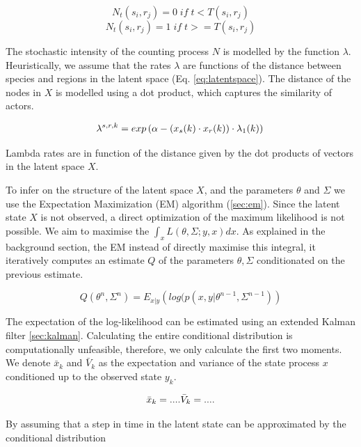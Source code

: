 \documentclass[mscthesis]{usiinfthesis}
\begin{document}
\[
N_t(s_i, r_j) = 0 \; if \; t < T(s_i, r_j)
\]
\[
N_t(s_i, r_j) = 1 \; if \; t >= T(s_i, r_j)
\]

The stochastic intensity of the counting process $N$ is modelled by the function $\lambda$. Heuristically, we assume that the rates $\lambda$ are functions of the distance between species and regions in the latent space (Eq. \ref{eq:latentspace}). The distance of the nodes in $X$ is modelled using a dot product, which captures the similarity of actors.

\begin{eqfloat}
\begin{equation}
\lambda^{s, r, k} = exp\left(\alpha-(x_s(k) \cdot x_r(k)) \cdot \lambda_1(k) \right) \\
\label{eq:ourmodel_lambda}
\end{equation}
\caption{Lambda rates are in function of the distance given by the dot products of vectors in the latent space $X$.}
\end{eqfloat}

To infer on the structure of the latent space $X$, and the parameters $\theta$  and $\Sigma$ we use the Expectation Maximization (EM) algorithm (\ref{sec:em}). Since the latent state $X$ is not observed, a direct optimization of the maximum likelihood is not possible. We aim to maximise the $\int_x L(\theta, \Sigma ; y, x) dx$. As explained in the background section, the EM instead of directly maximise this integral, it iteratively computes an estimate $Q$ of the parameters $\theta, \Sigma$ conditionated on the previous estimate. 

\[
Q(\theta^{n}, \Sigma^{n}) = E_{x|y} \left( log(p(x, y | \theta^{n-1}, \Sigma^{n-1}) \right)
\]

The expectation of the log-likelihood can be estimated using an extended Kalman filter \ref{sec:kalman}. Calculating the entire conditional distribution is computationally unfeasible, therefore, we only calculate the first two moments. We denote $\bar{x}_{k}$ and $\bar{V}_{k}$ as the expectation and variance of the state process $x$ conditioned up to the observed state $y_k$. 

\[
\bar{x}_{k} = .... \\
\bar{V}_{k} = ....
\]

By assuming that a step in time in the latent state can be approximated by the conditional distribution 
\end{document}
